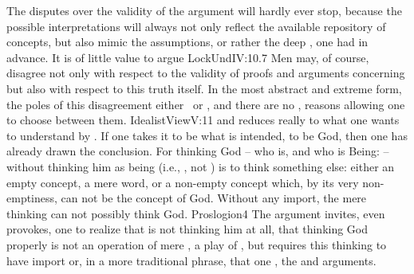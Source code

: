 \newp \pa The disputes over the validity of the argument will hardly ever stop,
because the possible interpretations will always not only reflect the available
repository of concepts, but also mimic the assumptions, or rather the deep
, one had in advance.  It is of little value to argue
\citet{[h]ow far the idea of a most perfect being, which a man may frame in his
  mind, does or does not prove the existence of a God [...]  For in the
  different make of men's tempers and application of their thoughts, some
  arguments prevail more on one, and some on another, for the confirmation of
  the same truth.}{LockUnd}{IV:10.7} Men may, of course, disagree not only with
respect to the validity of proofs and arguments concerning 
but also with respect to this truth itself.  In the most abstract and extreme
form, the poles of this disagreement  either \yes\ or \No, and there
are no ,  reasons allowing one to choose between them.
\citet{The ontological argument is a report of experience}{IdealistView}{V:11}
and reduces really to what one wants to understand by .  If one takes it to be what is intended, to be God,
then one has already drawn the conclusion. For thinking God -- who is, and who
is Being:  -- without thinking him as being (i.e.,
, not ) is to think something else: either an empty
concept, a mere word, or a non-empty concept which, by its very non-emptiness,
can not be the concept of God.  Without any  import, the mere
 thinking can not possibly think God.  \citet{For in one sense a
  thing is thought when the word signifying it is thought; in another sense when
  the very object which the thing is is understood. In the first sense, then,
  God can be thought not to exist, but not at all in the second sense. No one,
  indeed, understanding what God is can think that God does not exist
  [...]}{Proslogion}{4} The argument invites, even provokes, one to realize that
 is not thinking him at all, that thinking God properly
is not an operation of mere , a play of , but requires
this thinking to have  import or, in a more traditional phrase,
that one ,  the
 and arguments.



